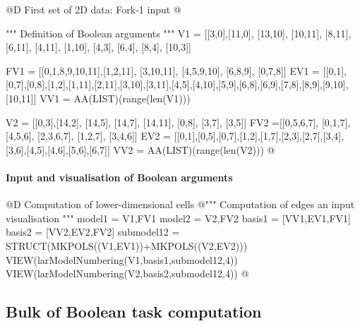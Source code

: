 \documentclass[11pt,oneside]{article}	%
\begin{document}
@D First set of 2D data: Fork-1 input
@{""" Definition of Boolean arguments """
V1 = [[3,0],[11,0], [13,10], [10,11], [8,11], [6,11], [4,11], [1,10], [4,3], [6,4], 
	[8,4], [10,3]]
	
FV1 = [[0,1,8,9,10,11],[1,2,11], [3,10,11], [4,5,9,10], [6,8,9], [0,7,8]]
EV1 = [[0,1],[0,7],[0,8],[1,2],[1,11],[2,11],[3,10],[3,11],[4,5],[4,10],[5,9],[6,8],[6,9],[7,8],[8,9],[9,10],[10,11]]
VV1 = AA(LIST)(range(len(V1)))

V2 = [[0,3],[14,2], [14,5], [14,7], [14,11], [0,8], [3,7], [3,5]]
FV2 =[[0,5,6,7], [0,1,7], [4,5,6], [2,3,6,7], [1,2,7], [3,4,6]]
EV2 = [[0,1],[0,5],[0,7],[1,2],[1,7],[2,3],[2,7],[3,4],[3,6],[4,5],[4,6],[5,6],[6,7]]
VV2 = AA(LIST)(range(len(V2)))
@}


\paragraph{Input and visualisation of Boolean arguments}

@D Computation of lower-dimensional cells
@{""" Computation of edges an input visualisation """
model1 = V1,FV1
model2 = V2,FV2
basis1 = [VV1,EV1,FV1]
basis2 = [VV2,EV2,FV2]
submodel12 = STRUCT(MKPOLS((V1,EV1))+MKPOLS((V2,EV2)))
VIEW(larModelNumbering(V1,basis1,submodel12,4))
VIEW(larModelNumbering(V2,basis2,submodel12,4))
@}

\subsection{Bulk of Boolean task computation}
\end{document}
